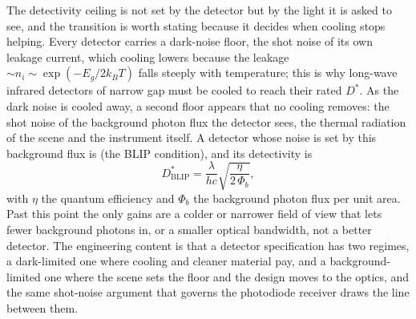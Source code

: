 \begin{mastery}
The detectivity ceiling is not set by the detector but by the light it is
asked to see, and the transition is worth stating because it decides when
cooling stops helping. Every detector carries a dark-noise floor, the shot
noise of its own leakage current, which cooling lowers because the leakage
$\sim n_i \sim \exp(-E_g/2k_B T)$ falls steeply with temperature; this is why
long-wave infrared detectors of narrow gap must be cooled to reach their
rated $D^{*}$. As the dark noise is cooled away, a second floor appears that
no cooling removes: the shot noise of the background photon flux the detector
sees, the thermal radiation of the scene and the instrument itself. A
detector whose noise is set by this background flux is
 (the BLIP condition), and its detectivity is
\[
D^{*}_{\text{BLIP}} = \frac{\lambda}{hc}
\sqrt{\frac{\eta}{2\,\Phi_b}},
\]
with $\eta$ the quantum efficiency and $\Phi_b$ the background photon flux per
unit area. Past this point the only gains are a colder or narrower field of
view that lets fewer background photons in, or a smaller optical bandwidth,
not a better detector. The engineering content is that a detector
specification has two regimes, a dark-limited one where cooling and cleaner
material pay, and a background-limited one where the scene sets the floor and
the design moves to the optics, and the same shot-noise argument that governs
the photodiode receiver draws the line between them.
\end{mastery}



